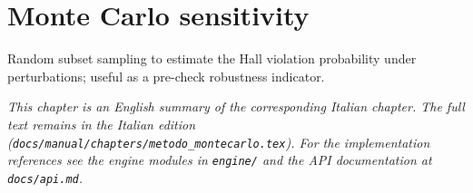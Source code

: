 \chapter{Monte Carlo sensitivity}
\label{ch:metodo_montecarlo_en}

Random subset sampling to estimate the Hall violation probability under perturbations; useful as a pre-check robustness indicator.

\medskip
\noindent
\textit{This chapter is an English summary of the corresponding Italian chapter. The full text remains in the Italian edition (\texttt{docs/manual/chapters/metodo\_montecarlo.tex}). For the implementation references see the engine modules in \texttt{engine/} and the API documentation at \texttt{docs/api.md}.}
